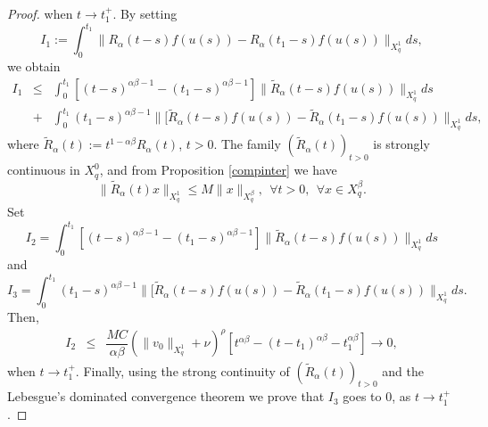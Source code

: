 \documentclass[12pt,reqno]{amsart}
\begin{document}
\begin{proof}
	when $t\rightarrow t_1^+.$  By setting
	$$I_1:=\int_{0}^{t_1}\|R_{\alpha}(t-s)f(u(s))-R_{\alpha}(t_1-s)f(u(s))\|_{X^{1}_{q}}ds,$$
	we obtain
	\begin{eqnarray*}
		I_1&\leq&\int_{0}^{t_1}[(t-s)^{\alpha\beta-1}-(t_1-s)^{\alpha\beta-1}]\|\tilde{R}_{\alpha}(t-s)f(u(s))\|_{X^{1}_{q}}ds\\
		&+& \int_{0}^{t_1}(t_1-s)^{\alpha\beta-1}\|[\tilde{R}_{\alpha}(t-s)f(u(s))-\tilde{R}_{\alpha}(t_1-s)f(u(s))\|_{X^{1}_{q}}ds,
	\end{eqnarray*}
	where $\tilde{R}_{\alpha}(t):= t^{1-\alpha\beta}R_{\alpha}(t)$, $t>0$. The family $(\tilde{R}_{\alpha}(t))_{t>0}$ is strongly continuous in $X^{0}_{q}$, and from Proposition \ref{compinter} we have
	\begin{equation*}
		\|\tilde{R}_{\alpha}(t)x\|_{X^{1}_{q}}\leq M \|x\|_{X^{\beta}_{q}}, \ \ \forall t>0,\ \ \forall x\in X^{\beta}_{q}.
	\end{equation*}
	Set
	$$I_2=\int_{0}^{t_1}[(t-s)^{\alpha\beta-1}-(t_1-s)^{\alpha\beta-1}]\|\tilde{R}_{\alpha}(t-s)f(u(s))\|_{X^{1}_{q}}ds$$
	and
	$$I_3=\int_{0}^{t_1}(t_1-s)^{\alpha\beta-1}\|[\tilde{R}_{\alpha}(t-s)f(u(s))-\tilde{R}_{\alpha}(t_1-s)f(u(s))\|_{X^{1}_{q}}ds.$$
	Then, 
	\begin{eqnarray*}
		I_2	&\leq& \dfrac{MC}{\alpha\beta}(\|v_0\|_{X^{1}_{q}}+\nu)^{\rho}[t^{\alpha\beta}-(t-t_1)^{\alpha\beta}-t_1^{\alpha\beta}]
		\rightarrow 0,
	\end{eqnarray*}
	when $t\rightarrow t_1^+$. Finally, using the strong continuity of $(\tilde{R}_{\alpha}(t))_{t>0}$ and the Lebesgue's dominated
	convergence theorem we prove that $I_3$ goes to $0$, as $t\rightarrow t_1^+$.

\end{proof}
\end{document}
